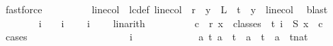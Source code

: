 \begin{isabellebody}
\ fastforce\isanewline
\ \ \ \ \ \ \isamarkupfalse%
\ \isamarkupfalse%
\ linecol\ \ lc{\isacharunderscore}{\kern0pt}def{\isacharcolon}{\kern0pt}\ {\isachardoublequoteopen}linecol\ {\isacharless}{\kern0pt}\ r\ {\isasymand}\ {\isacharparenleft}{\kern0pt}{\isasymforall}y\ {\isasymin}\ L{\isacharprime}{\kern0pt}\ {\isacharbackquote}{\kern0pt}\ {\isacharbraceleft}{\kern0pt}{\isachardot}{\kern0pt}{\isachardot}{\kern0pt}{\isacharless}{\kern0pt}t{\isacharbraceright}{\kern0pt}{\isachardot}{\kern0pt}\ {\isasymchi}\ y\ {\isacharequal}{\kern0pt}\ linecol{\isacharparenright}{\kern0pt}{\isachardoublequoteclose}\ \isamarkupfalse%
\ blast\isanewline
\ \ \ \ \ \ \isamarkupfalse%
\ {\isachardoublequoteopen}i\ {\isacharequal}{\kern0pt}\ {}{\isachardoublequoteclose}\ {\isacharbar}{\kern0pt}\ {\isachardoublequoteopen}i\ {\isacharequal}{\kern0pt}\ {}{\isachardoublequoteclose}\ \isamarkupfalse%
\ {\isacartoucheopen}i\ {\isasymle}\ {}{\isacartoucheclose}\ \isamarkupfalse%
\ linarith\isanewline
\ \ \ \ \ \ \isamarkupfalse%
\ \isamarkupfalse%
\ {\isachardoublequoteopen}{\isasymexists}c\ {\isacharless}{\kern0pt}\ r{\isachardot}{\kern0pt}\ {\isacharparenleft}{\kern0pt}{\isasymforall}x\ {\isasymin}\ classes\ {}\ t\ i{\isachardot}{\kern0pt}\ {\isasymchi}\ {\isacharparenleft}{\kern0pt}S{}\ x{\isacharparenright}{\kern0pt}\ {\isacharequal}{\kern0pt}\ c{\isacharparenright}{\kern0pt}{\isachardoublequoteclose}\isanewline
\ \ \ \ \ \ \isamarkupfalse%
\ {\isacharparenleft}{\kern0pt}cases{\isacharparenright}{\kern0pt}\isanewline
\ \ \ \ \ \ \ \ \isamarkupfalse%
\ {}\isanewline
\ \ \ \ \ \ \ \ \isamarkupfalse%
\ {\isachardoublequoteopen}i\ {\isacharequal}{\kern0pt}\ {}{\isachardoublequoteclose}\isanewline
\ \ \ \ \ \ \ \ \isamarkupfalse%
\ {\isacharasterisk}{\kern0pt}{\isacharcolon}{\kern0pt}\ {\isachardoublequoteopen}{\isasymforall}a\ t{\isachardot}{\kern0pt}\ a\ {\isasymin}\ {\isacharbraceleft}{\kern0pt}{\isachardot}{\kern0pt}{\isachardot}{\kern0pt}{\isacharless}{\kern0pt}t{\isacharplus}{\kern0pt}{}{\isacharbraceright}{\kern0pt}\ {\isasymand}\ a\ {\isasymnoteq}\ t\ {\isasymlongleftrightarrow}\ a\ {\isasymin}\ {\isacharbraceleft}{\kern0pt}{\isachardot}{\kern0pt}{\isachardot}{\kern0pt}{\isacharless}{\kern0pt}{\isacharparenleft}{\kern0pt}t{\isacharcolon}{\kern0pt}{\isacharcolon}{\kern0pt}nat{\isacharparenright}{\kern0pt}{\isacharbraceright}{\kern0pt}{\isachardoublequoteclose}\ \isamarkupfalse%

\end{isabellebody}
